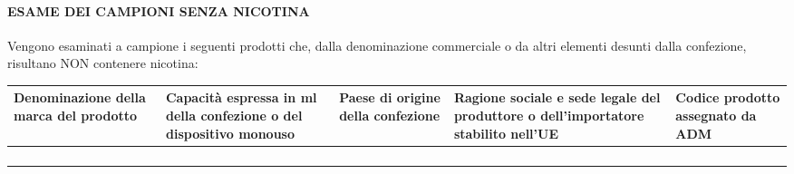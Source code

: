 \documentclass[12pt]{article}
\begin{document}
\paragraph{ESAME DEI CAMPIONI SENZA NICOTINA}Vengono esaminati a campione i seguenti prodotti che, dalla denominazione commerciale o da altri elementi desunti dalla confezione, risultano NON contenere nicotina:

\begin{tabularx}{\textwidth}{|Y|Y|Y|Y|Y|}
    \hline
    Denominazione della marca del prodotto & Capacità espressa in ml della confezione o del dispositivo monouso & Paese di origine della confezione & Ragione sociale e sede legale del produttore o dell'importatore stabilito nell'UE & Codice prodotto assegnato da ADM \\
    \hline
     & & & & \\[20pt]
    \hline
     & & & & \\[20pt]
    \hline
     & & & & \\[20pt]
    \hline
     & & & & \\[20pt]
    \hline
\end{tabularx}

\newpage
\end{document}
